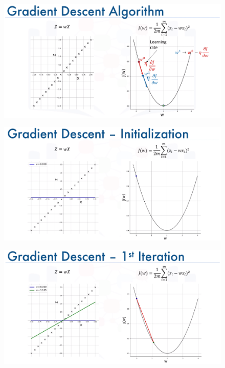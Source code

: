 \documentclass[10pt, compress]{beamer}
\begin{document}
\begin{frame}
  \begin{figure}
    \includegraphics[width=1\linewidth]{imgs/edx_dl_keras/gd4}
  \end{figure}
\end{frame}

\begin{frame}
  \begin{figure}
    \includegraphics[width=1\linewidth]{imgs/edx_dl_keras/gd5}
  \end{figure}
\end{frame}

\begin{frame}
  \begin{figure}
    \includegraphics[width=1\linewidth]{imgs/edx_dl_keras/gd6}
  \end{figure}
\end{frame}
\end{document}

